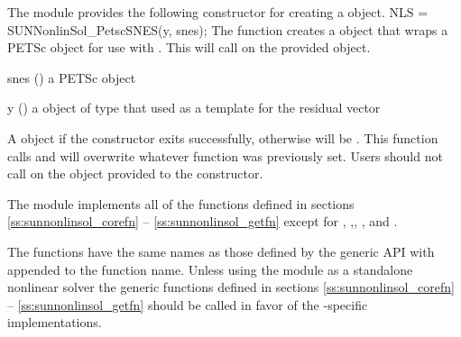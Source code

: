 The {\sunnonlinsolpetsc} module provides the following constructor
for creating a  object.
{
  NLS = SUNNonlinSol\_PetscSNES(y, snes);
}
{
  The function  creates a 
  object that wraps a PETSc  object for use with {\sundials}.
  This will call  on the provided  object.
}
{
  \begin{args}[snes]
  \item[snes] ()
    a PETSc  object
  \item[y] ()
    a  object of type {\nvecpetsc} that used as a template
    for the residual vector
  \end{args}
}
{
  A {\sunnonlinsol} object if the constructor exits successfully,
  otherwise  will be .
}
{
  {\warn} This function calls  and will overwrite
  whatever function was previously set. Users should not call
   on the  object provided to the constructor.
}

The {\sunnonlinsolpetsc} module implements all of the functions
defined in sections \ref{ss:sunnonlinsol_corefn} --
\ref{ss:sunnonlinsol_getfn} except for ,
,\newline {},
, and .

The {\sunnonlinsolpetsc} functions have the same names as those defined
by the generic {\sunnonlinsol} API with  appended to the
function name. Unless using the {\sunnonlinsolpetsc} module as a
standalone nonlinear solver the generic functions defined in sections
\ref{ss:sunnonlinsol_corefn} -- \ref{ss:sunnonlinsol_getfn} should be
called in favor of the {\sunnonlinsolpetsc}-specific implementations.

